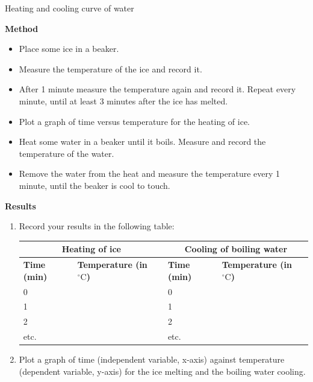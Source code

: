 \begin{f_experiment}{Heating and cooling curve of water}
{\label{m38736*eip-862}\noindent{}\textbf{Method}
\label{m38736*id9872}\begin{itemize}[noitemsep]
            \item Place some ice in a beaker.
\item Measure the temperature of the ice and record it.
\item After 1 minute measure the temperature again and record it. Repeat every minute, until at least 3 minutes after the ice has melted.
\item Plot a graph of time versus temperature for the heating of ice.
\item Heat some water in a beaker until it boils. Measure and record the temperature of the water.
\item Remove the water from the heat and measure the temperature every 1 minute, until the beaker is cool to touch.
\end{itemize}
\label{m38736*eip-282}
      \label{m38736*eip-863}\noindent{}\textbf{Results} \\
\begin{enumerate}[noitemsep, label=\textbf{\arabic*}.]
\item Record your results in the following table: 
          \begin{table}[H]
        \begin{center}
      \label{m38736*uid434}
    \noindent
      \begin{tabular}{|l|l|l|l|}\hline
\multicolumn{2}{|c|}{Heating of ice} & \multicolumn{2}{c|}{Cooling of boiling water}  \\ \hline
 \textbf{Time (min)} & \textbf{Temperature (in $^{\circ} \text{C}$)} &  \textbf{Time (min)} & \textbf{Temperature (in $^{\circ} \text{C}$)} \\ \hline
     0    & & 0    & \\ \hline 
     1    & & 1    & \\ \hline
     2    & & 2    & \\ \hline
     etc. & & etc. & \\ \hline
    \end{tabular}
      \end{center}
\end{table}
\item Plot a graph of time (independent variable, x-axis) against temperature (dependent variable, y-axis) for the ice melting and the boiling water cooling. 
\end{enumerate}
 
}
\end{f_experiment}
